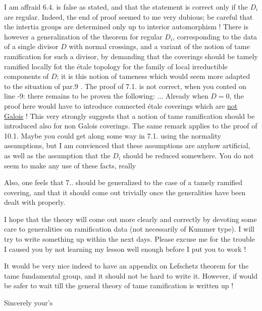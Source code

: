 I am affraid  6.4. is false as stated, and that the statement is correct only if the $D_i$ are regular. Indeed, the end of   proof seemed to me very dubious; be careful that the intertia groups are determined only up to interior automorphism ! There is however a  generalization of the theorem for regular $D_i$, corresponding to the data of a single divisor $D$ with normal crossings, and a variant of the notion of tame ramification for such a divisor, by demanding that the coverings should be tamely ramified locally fot the étale topology for the family of local irreductible components of $D$; it is this notion of tameness which would seem more adapted to the situation of par.9 .
The proof of 7.1. is not correct, when you conted on line -9: there remains to be proven the following: ... Already when $D=0$, the proof here would have to introduce connected étale coverings which are \uline{not Galois} ! This very strongly suggests that a notion of tame ramification should be introduced also  for non Galois coverings. The same remark applies to the proof of 10.1. Maybe you could get along some way in 7.1. using the normality assumptions, but I am convienced that these assumptions are anyhow artificial, as well as the assumption that the $D_i$ should be reduced somewhere. You do not seem to make any use of these facts, really

Also, one feels that 7.. should be generalized to the case of a tamely ramified covering, and that it should come out trivially once the generalities have been dealt with properly.

I hope that the theory will come out more clearly and correctly by devoting some care to generalities on ramification data (not necessarily of Kummer type). I will try to write something up within the next days. Please excuse me for the trouble I caused you by not learning my lesson well enough before I put you to work !

It would be very nice indeed to have an appendix on Lefschetz theorem for the tame fundamental group, and it should not be hard to write it. However, if would be safer to wait till the general theory of tame ramification is written up !

Sincerely your's\\
\\

